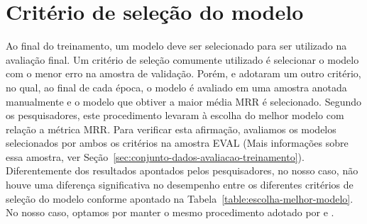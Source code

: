 \section{Critério de seleção do modelo}
\label{sec:ape-criterio-de-selecao-do-modelo-experimento}

Ao final do treinamento, um modelo deve ser selecionado para ser utilizado na avaliação final. Um critério de seleção comumente utilizado é selecionar o modelo com o menor erro na amostra de validação. Porém, \cite{iyer-etal-2016-summarizing} e \cite{yao-2018} adotaram um outro critério, no qual, ao final de cada época, o modelo é avaliado em uma amostra anotada manualmente e o modelo que obtiver a maior média MRR é selecionado. Segundo os pesquisadores, este procedimento levaram à escolha do melhor modelo com relação a métrica MRR. Para verificar esta afirmação, avaliamos os modelos selecionados por ambos os critérios na amostra EVAL (Mais informações sobre essa amostra, ver Seção~\ref{sec:conjunto-dados-avaliacao-treinamento}). Diferentemente dos resultados apontados pelos pesquisadores, no nosso caso, não houve uma diferença significativa no desempenho entre os diferentes critérios de seleção do modelo conforme apontado na Tabela~\ref{table:escolha-melhor-modelo}. No nosso caso, optamos por manter o mesmo procedimento adotado por \cite{iyer-etal-2016-summarizing} e \cite{yao-2018}.


